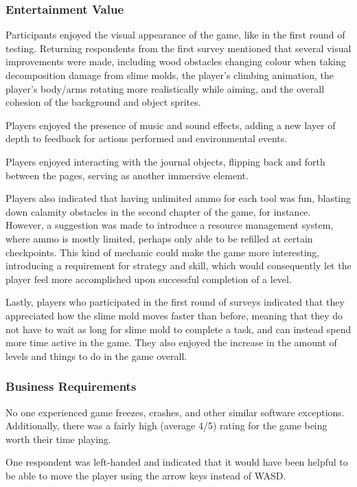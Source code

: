\documentclass[12pt, titlepage]{article}
\begin{document}
\subsubsection{Entertainment Value}
Participants enjoyed the visual appearance of the game, like in the first round 
of testing. Returning respondents from the first survey mentioned that several 
visual improvements were made, including wood obstacles changing colour when 
taking decomposition damage from slime molds, the player's climbing animation, 
the player's body/arms rotating more realistically while aiming, and the overall 
cohesion of the background and object sprites.

Players enjoyed the presence of music and sound effects, adding a new layer 
of depth to feedback for actions performed and environmental events.

Players enjoyed interacting with the journal objects, flipping 
back and forth between the pages, serving as another immersive element.

Players also indicated that having unlimited ammo for each tool was fun, blasting 
down calamity obstacles in the second chapter of the game, for instance. However, 
a suggestion was made to introduce a resource management system, where ammo is 
mostly limited, perhaps only able to be refilled at certain checkpoints. This 
kind of mechanic could make the game more interesting, introducing a requirement 
for strategy and skill, which would consequently let the player feel more 
accomplished upon successful completion of a level.

Lastly, players who participated in the first round of surveys indicated that 
they appreciated how the slime mold moves faster than before, meaning that they 
do not have to wait as long for slime mold to complete a task, and can instead 
spend more time active in the game. They also enjoyed the increase in the amount 
of levels and things to do in the game overall.

\subsubsection{Business Requirements}
No one experienced game freezes, crashes, and other similar software exceptions.
Additionally, there was a fairly high (average 4/5) rating for the game being 
worth their time playing.

One respondent was left-handed and indicated that it would have been helpful 
to be able to move the player using the arrow keys instead of WASD.
\end{document}
